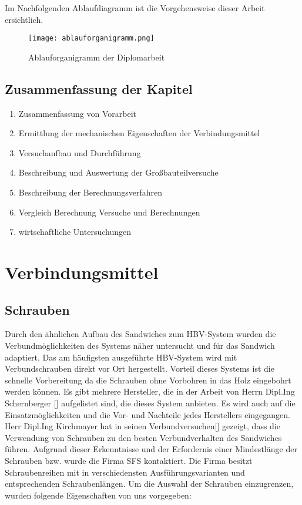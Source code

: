 \documentclass[12 pt,a4 paper ]{scrreprt}
\begin{document}
\newpage{}
Im Nachfolgenden Ablaufdiagramm ist die Vorgehensweise dieser Arbeit ersichtlich.

\begin{figure}[h]
\begin{center}
\texttt{[image: ablauforganigramm.png]}
\caption{Ablauforganigramm der Diplomarbeit}
\end{center}
\end{figure}




\section{Zusammenfassung der Kapitel}

\begin{enumerate}
\item Zusammenfassung von Vorarbeit 
\item Ermittlung der mechanischen Eigenschaften der Verbindungsmittel
\item Versuchaufbau und Durchführung
\item Beschreibung und Auswertung der Großbauteilversuche
\item Beschreibung der Berechnungsverfahren
\item Vergleich Berechnung Versuche und Berechnungen
\item wirtschaftliche Untersuchungen

\end{enumerate}




\chapter{Verbindungsmittel}

\section{Schrauben}

Durch den ähnlichen Aufbau des Sandwiches zum HBV-System wurden die Verbundmöglichkeiten des Systems näher untersucht und für das Sandwich adaptiert. Das am häufigsten ausgeführte HBV-System wird mit Verbundschrauben direkt vor Ort hergestellt. Vorteil dieses Systems ist die schnelle Vorbereitung da die Schrauben ohne Vorbohren in das Holz eingebohrt werden können. Es gibt mehrere Hersteller, die in der Arbeit von Herrn Dipl.Ing Schernberger [] aufgelistet sind, die dieses System anbieten. Es wird auch auf die Einsatzmöglichkeiten und die Vor- und Nachteile jedes Herstellers eingegangen. Herr Dipl.Ing Kirchmayer hat in seinen Verbundversuchen[] gezeigt, dass die Verwendung von Schrauben zu den besten Verbundverhalten des Sandwiches führen. Aufgrund dieser Erkenntnisse und der Erfordernis einer Mindestlänge der Schrauben bzw. wurde die Firma SFS kontaktiert. Die Firma besitzt Schraubenreihen mit in verschiedensten Ausführungsvarianten und entsprechenden Schraubenlängen. Um die Auswahl der Schrauben einzugrenzen, wurden folgende Eigenschaften von uns vorgegeben:
\end{document}

